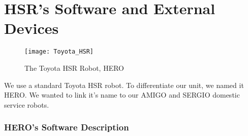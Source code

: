 \section{HSR's Software and External Devices}

\setlength\intextsep{0pt}
\begin{wrapfigure}[12]{RH}{0.3\textwidth}
	\centering
	\texttt{[image: Toyota\_HSR]}
	\caption{The Toyota\texttrademark\hspace{0em} HSR Robot, HERO}
	\label{fig:hsr}
\end{wrapfigure}

We use a standard Toyota\texttrademark\hspace{0em} HSR robot. To differentiate our unit, we named it HERO. We wanted to link it's name to our AMIGO and SERGIO domestic service robots.

\subsubsection{HERO's Software Description}

